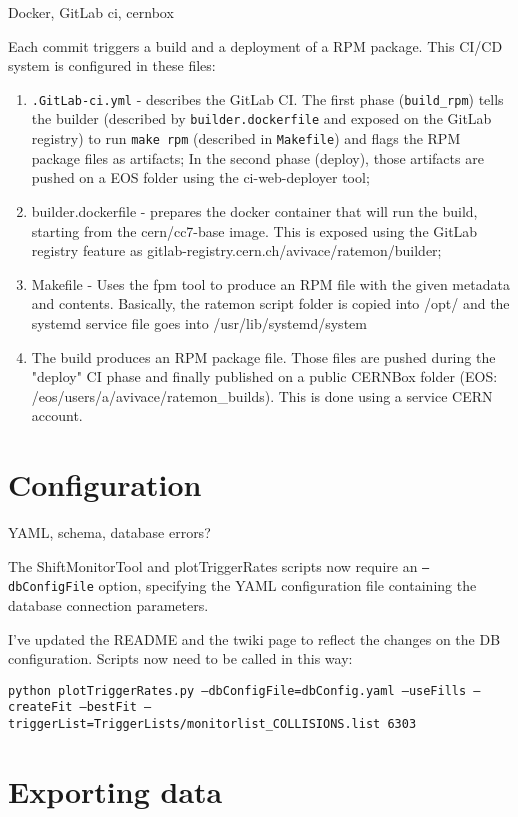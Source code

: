 Docker, GitLab ci, cernbox

Each commit triggers a build and a deployment of a RPM package. This CI/CD system is configured in these files:

\begin{enumerate}
	\item \texttt{.GitLab-ci.yml} - describes the GitLab CI. The first phase (\texttt{build\_rpm}) tells the builder (described by \texttt{builder.dockerfile} and exposed on the GitLab registry) to run \texttt{make rpm} (described in \texttt{Makefile}) and flags the RPM package files as artifacts; In the second phase (deploy), those artifacts are pushed on a EOS folder using the ci-web-deployer tool;
	\item builder.dockerfile - prepares the docker container that will run the build, starting from the cern/cc7-base image. This is exposed using the GitLab registry feature as gitlab-registry.cern.ch/avivace/ratemon/builder;
	\item Makefile - Uses the fpm tool to produce an RPM file with the given metadata and contents. Basically, the ratemon script folder is copied into /opt/ and the systemd service file goes into /usr/lib/systemd/system

	\item The build produces an RPM package file. Those files are pushed during the "deploy" CI phase and finally published on a public CERNBox folder (EOS: /eos/users/a/avivace/ratemon\_builds). This is done using a service CERN account.
\end{enumerate}

\section{Configuration}

YAML, schema, database errors?

The ShiftMonitorTool and plotTriggerRates scripts now require an \texttt{--dbConfigFile} option, specifying the YAML configuration file containing the database connection parameters.

I've updated the README and the twiki page to reflect the changes on the DB configuration. Scripts now need to be called in this way:

\texttt{python plotTriggerRates.py --dbConfigFile=dbConfig.yaml --useFills --createFit --bestFit --triggerList=TriggerLists/monitorlist\_COLLISIONS.list 6303}

\section{Exporting data}

